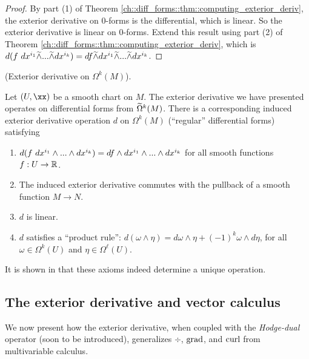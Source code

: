 \begin{proof}
    By part (1) of Theorem \ref{ch::diff_forms::thm::computing_exterior_deriv}, the exterior derivative on $0$-forms is the differential, which is linear. So the exterior derivative is linear on $0$-forms. Extend this result using part (2) of Theorem \ref{ch::diff_forms::thm::computing_exterior_deriv}, which is $d(f \text{ } dx^{i_1} \widetilde{\wedge} ... \widetilde{\wedge} dx^{i_k}) = df \widetilde{\wedge} dx^{i_1} \widetilde{\wedge} ... \widetilde{\wedge} dx^{i_k}$.
\end{proof}

\begin{remark}
     (Exterior derivative on $\Omega^k(M)$).
    
    Let $(U, \xx)$ be a smooth chart on $M$. The exterior derivative we have presented operates on differential forms from $\widetilde{\Omega}^k(M)$. There is a corresponding induced exterior derivative operation $d$ on $\Omega^k(M)$ (``regular'' differential forms) satisfying
    
    \begin{enumerate}
        \item $d(f \text{ } dx^{i_1} \wedge ... \wedge dx^{i_k}) = df \wedge dx^{i_1} \wedge ... \wedge dx^{i_k}$ for all smooth functions $f:U \rightarrow \mathbb{R}$.
        \item The induced exterior derivative commutes with the pullback of a smooth function $M \rightarrow N$.
        \item $d$ is linear.
        \item $d$ satisfies a ``product rule'': $d(\omega \wedge \eta) = d\omega \wedge \eta + (-1)^k \omega \wedge d \eta$, for all $\omega \in \Omega^k(U)$ and $\eta \in \Omega^\ell(U)$.
    \end{enumerate}
    
    It is shown in \cite[p. 364]{book::SM} that these axioms indeed determine a unique operation.
\end{remark}

\subsection*{The exterior derivative and vector calculus}

We now present how the exterior derivative, when coupled with the \textit{Hodge-dual} operator (soon to be introduced), generalizes $\div$, $\text{grad}$, and $\text{curl}$ from multivariable calculus.

